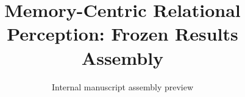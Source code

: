 \documentclass[10pt,twocolumn]{article}
\begin{document}
\title{Memory-Centric Relational Perception: Frozen Results Assembly}
\author{Internal manuscript assembly preview}
\date{}
\maketitle



\clearpage

\end{document}
